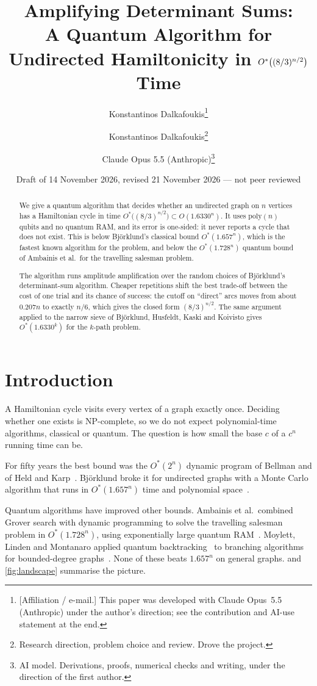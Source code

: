\documentclass[11pt,a4paper]{article}
\title{Amplifying Determinant Sums:\\[2pt]
A Quantum Algorithm for Undirected Hamiltonicity in $\Ostar\big((8/3)^{n/2}\big)$ Time}
\author{Konstantinos Dalkafoukis\thanks{[Affiliation / e-mail.] This paper was developed with Claude Opus~5.5 (Anthropic) under the author's direction; see the contribution and AI-use statement at the end.}}
\author{
  Konstantinos Dalkafoukis\thanks{Research direction, problem choice and review. Drove the project.}
  \and
  Claude Opus 5.5 (Anthropic)\thanks{AI model. Derivations, proofs, numerical checks and writing, under the direction of the first author.}
}
\date{Draft of 14 November 2026, revised 21 November 2026 --- not peer reviewed}
\theoremstyle{plain}
\theoremstyle{remark}
\newcommand{\Ostar}{O^{*}}
\begin{document}
\maketitle

\begin{abstract}
\noindent
We give a quantum algorithm that decides whether an undirected graph on $n$ vertices has a Hamiltonian cycle in time $\Ostar\big((8/3)^{n/2}\big) \subset O(1.6330^n)$. It uses $\mathrm{poly}(n)$ qubits and no quantum RAM, and its error is one-sided: it never reports a cycle that does not exist. This is below Björklund's classical bound $\Ostar(1.657^n)$, which is the fastest known algorithm for the problem, and below the $\Ostar(1.728^n)$ quantum bound of Ambainis et al.\ for the travelling salesman problem.

The algorithm runs amplitude amplification over the random choices of Björklund's determinant-sum algorithm. Cheaper repetitions shift the best trade-off between the cost of one trial and its chance of success: the cutoff on ``direct'' arcs moves from about $0.207n$ to exactly $n/6$, which gives the closed form $(8/3)^{n/2}$. The same argument applied to the narrow sieve of Björklund, Husfeldt, Kaski and Koivisto gives $\Ostar(1.6330^k)$ for the $k$-path problem.
\end{abstract}

\section{Introduction}

A Hamiltonian cycle visits every vertex of a graph exactly once. Deciding whether one exists is NP-complete, so we do not expect polynomial-time algorithms, classical or quantum. The question is how small the base $c$ of a $c^n$ running time can be.

For fifty years the best bound was the $\Ostar(2^n)$ dynamic program of Bellman and of Held and Karp~\cite{bellman,heldkarp}. Björklund broke it for undirected graphs with a Monte Carlo algorithm that runs in $\Ostar(1.657^n)$ time and polynomial space~\cite{bjorklund}.

Quantum algorithms have improved other bounds. Ambainis et al.\ combined Grover search with dynamic programming to solve the travelling salesman problem in $\Ostar(1.728^n)$, using exponentially large quantum RAM~\cite{ambainis}. Moylett, Linden and Montanaro applied quantum backtracking~\cite{montanaro} to branching algorithms for bounded-degree graphs~\cite{mlm}. None of these beats $1.657^n$ on general graphs.  and \cref{fig:landscape} summarise the picture.
\end{document}
